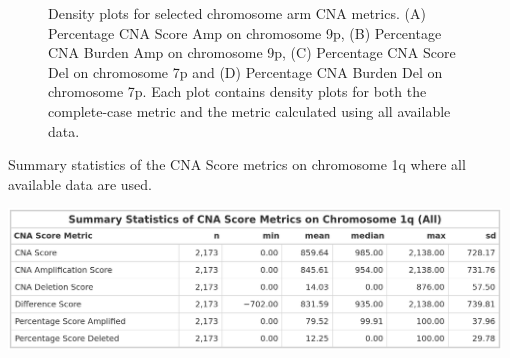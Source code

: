 \begin{figure}[H]
\begin{minipage}{.49\textwidth}
\end{minipage}
\hfill    
\begin{minipage}{.49\textwidth}
\end{minipage}
    \caption[Density plots for selected chromosome arm CNA metrics.]{Density plots for selected chromosome arm CNA metrics. (A) Percentage CNA Score Amp on chromosome 9p, (B) Percentage CNA Burden Amp on chromosome 9p, (C) Percentage CNA Score Del on chromosome 7p and (D) Percentage CNA Burden Del on chromosome 7p. Each plot contains density plots for both the complete-case metric and the metric calculated using all available data.}\label{fig:Plot-PerArm-DensityPlots}
\end{figure} 
\vfill 

\begin{table}[!ht]
\center
\caption[Summary statistics of the CNA Score metrics on chromosome 1q where all available data are used.]{Summary statistics of the CNA Score metrics on chromosome 1q  where all available data are used.}
\includegraphics[width = 0.98\textwidth]{../tables/Chapter_2/CNA_Score_Metric_All_Chr1q_Summary.png}
\label{tab:Score_All_Chr1q}
\end{table}

